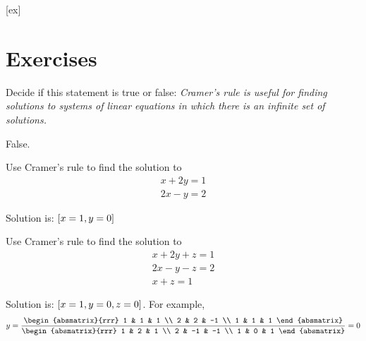 [ex]
\section*{Exercises}

\begin{enumialphparenastyle}

\begin{ex}Decide if this statement is true or false: \textit{Cramer's rule is useful for finding solutions to systems of linear
equations in which there is an infinite set of solutions.} 
\begin{sol}
False.
\end{sol}
\end{ex}

\begin{ex} Use Cramer's rule to find the solution to 
\begin{equation*}
\begin{array}{c}
x+2y=1 \\
2x-y=2
\end{array}
\end{equation*}
\begin{sol}
Solution is: $\left[x=1,y=0\right] $
\end{sol}
\end{ex}

\begin{ex} Use Cramer's rule to find the solution to 
\begin{equation*}
\begin{array}{c}
x+2y+z=1 \\
2x-y-z=2 \\
x+z=1
\end{array}
\end{equation*}
\begin{sol}
Solution is: $\left[x=1,y=0,z=0\right]$. For example,
\[
y=\frac{\begin{absmatrix}{rrr}
1 & 1 & 1 \\
2 & 2 & -1 \\
1 & 1 & 1
\end{absmatrix}}{\begin{absmatrix}{rrr}
1 & 2 & 1 \\
2 & -1 & -1 \\
1 & 0 & 1
\end{absmatrix}}=0
\]
\end{sol}
\end{ex}

\end{enumialphparenastyle}
